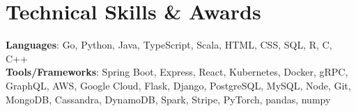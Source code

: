 \documentclass[letterpaper,11pt]{article}
\begin{document}
\section{Technical Skills \& Awards}
 \begin{itemize}[leftmargin=0.15in, label={}]
    \small{\item{
     \textbf{Languages}{: Go, Python, Java, TypeScript, Scala, HTML, CSS, SQL, R, C, C++} \\
     \textbf{Tools/Frameworks}{: Spring Boot, Express, React, Kubernetes, Docker, gRPC, GraphQL, AWS, Google Cloud, Flask, Django, PostgreSQL, MySQL, Node, Git, MongoDB, Cassandra, DynamoDB, Spark, Stripe, PyTorch, pandas, numpy} \\
    }}

 \end{itemize}



\end{document}
